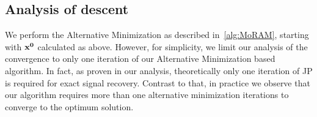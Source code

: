 %
%
%

\subsection{Analysis of descent}
We perform the Alternative Minimization as described in~\ref{alg:MoRAM}, starting with $\mathbf{x^0}$ calculated as above. However, for simplicity, we limit our analysis of the convergence to only one iteration of our Alternative Minimization based algorithm. In fact, as proven in our analysis, theoretically only one iteration of JP is required for exact signal recovery. Contrast to that, in practice we observe that our algorithm requires more than one alternative minimization iterations to converge to the optimum solution.

